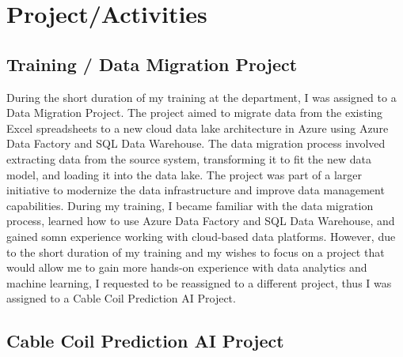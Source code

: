 \chapter{Project/Activities}
\label{ch:project}

\section{Training / Data Migration Project}

During the short duration of my training at the department, I was assigned to
a Data Migration Project. The project aimed to migrate data
from the existing Excel spreadsheets to a new cloud data lake architecture in
Azure using Azure Data Factory and SQL Data Warehouse. The data migration
process involved extracting data from the source system, transforming it to fit
the new data model, and loading it into the data lake. The project was part of
a larger initiative to modernize the data infrastructure and improve data
management capabilities. During my training, I became familiar with the data
migration process, learned how to use Azure Data Factory and SQL Data
Warehouse, and gained somn experience working with cloud-based data platforms.
However, due to the short duration of my training and my wishes to focus on a
project that would allow me to gain more hands-on experience with data
analytics and machine learning, I requested to be reassigned to a different
project, thus I was assigned to a Cable Coil Prediction AI Project.

\section{Cable Coil Prediction AI Project}

